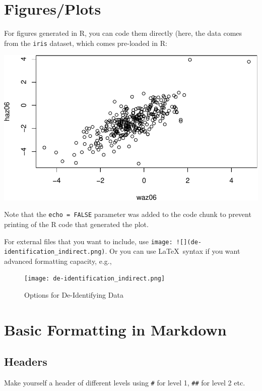 \documentclass[11pt,]{article}
\begin{document}
\hypertarget{figuresplots}{%
\section{Figures/Plots}\label{figuresplots}}

For figures generated in R, you can code them directly (here, the data
comes from the \texttt{iris} dataset, which comes pre-loaded in R:

\includegraphics{Rmarkdown_advanced_files/figure-latex/unnamed-chunk-5-1.pdf}

Note that the \texttt{echo\ =\ FALSE} parameter was added to the code
chunk to prevent printing of the R code that generated the plot.

For external files that you want to include, use
\texttt{image:\ !{[}{]}(de-identification\_indirect.png)}. Or you can
use \LaTeX~syntax if you want advanced formatting capacity, e.g.,

\begin{figure}[H]
  \centering
  \caption{Options for De-Identifying Data}
  \texttt{[image: de-identification\_indirect.png]}
\end{figure}

\hypertarget{basic-formatting-in-markdown}{%
\section{Basic Formatting in
Markdown}\label{basic-formatting-in-markdown}}

\hypertarget{headers}{%
\subsection{Headers}\label{headers}}

Make yourself a header of different levels using \texttt{\#} for level
1, \texttt{\#\#} for level 2 etc.
\end{document}

